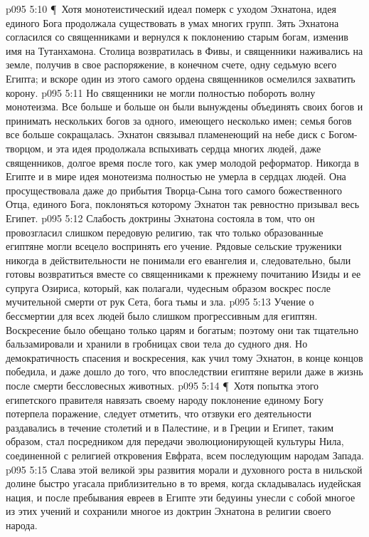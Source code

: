 \vs p095 5:10 \P\ Хотя монотеистический идеал померк с уходом Эхнатона, идея единого Бога продолжала существовать в умах многих групп. Зять Эхнатона согласился со священниками и вернулся к поклонению старым богам, изменив имя на Тутанхамона. Столица возвратилась в Фивы, и священники наживались на земле, получив в свое распоряжение, в конечном счете, одну седьмую всего Египта; и вскоре один из этого самого ордена священников осмелился захватить корону.
\vs p095 5:11 Но священники не могли полностью побороть волну монотеизма. Все больше и больше он были вынуждены объединять своих богов и принимать нескольких богов за одного, имеющего несколько имен; семья богов все больше сокращалась. Эхнатон связывал пламенеющий на небе диск с Богом\hyp{}творцом, и эта идея продолжала вспыхивать сердца многих людей, даже священников, долгое время после того, как умер молодой реформатор. Никогда в Египте и в мире идея монотеизма полностью не умерла в сердцах людей. Она просуществовала даже до прибытия Творца\hyp{}Сына того самого божественного Отца, единого Бога, поклоняться которому Эхнатон так ревностно призывал весь Египет.
\vs p095 5:12 Слабость доктрины Эхнатона состояла в том, что он провозгласил слишком передовую религию, так что только образованные египтяне могли всецело воспринять его учение. Рядовые сельские труженики никогда в действительности не понимали его евангелия и, следовательно, были готовы возвратиться вместе со священниками к прежнему почитанию Изиды и ее супруга Озириса, который, как полагали, чудесным образом воскрес после мучительной смерти от рук Сета, бога тьмы и зла.
\vs p095 5:13 Учение о бессмертии для всех людей было слишком прогрессивным для египтян. Воскресение было обещано только царям и богатым; поэтому они так тщательно бальзамировали и хранили в гробницах свои тела до судного дня. Но демократичность спасения и воскресения, как учил тому Эхнатон, в конце концов победила, и даже дошло до того, что впоследствии египтяне верили даже в жизнь после смерти бессловесных животных.
\vs p095 5:14 \P\ Хотя попытка этого египетского правителя навязать своему народу поклонение единому Богу потерпела поражение, следует отметить, что отзвуки его деятельности раздавались в течение столетий и в Палестине, и в Греции и Египет, таким образом, стал посредником для передачи эволюционирующей культуры Нила, соединенной с религией откровения Евфрата, всем последующим народам Запада.
\vs p095 5:15 Слава этой великой эры развития морали и духовного роста в нильской долине быстро угасала приблизительно в то время, когда складывалась иудейская нация, и после пребывания евреев в Египте эти бедуины унесли с собой многое из этих учений и сохранили многое из доктрин Эхнатона в религии своего народа.
